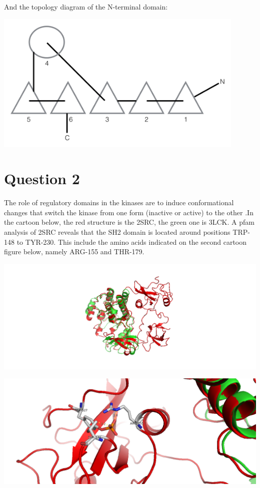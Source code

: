 \documentclass[11pt, a4paper,titlepage]{article}
\begin{document}
\clearpage
And the topology diagram of the N-terminal domain:

\includegraphics[width=12cm]{./Figures/1b.png}

\section*{Question 2}
 The role of regulatory
domains in the kinases are to induce conformational changes that
switch the kinase from one form (inactive or active) to the other
\cite{ConformationalPlasticityKinases}.In the cartoon below, the red
structure is the 2SRC, the green one is 3LCK. A pfam analysis of 2SRC
reveals that the SH2 domain is located around positions TRP-148 to
TYR-230. This include the amino acids indicated on the second cartoon
figure below, namely ARG-155 and THR-179.

\includegraphics[width=15cm]{./Figures/2a.png}

\includegraphics[width=15cm]{./Figures/2b.png}
\end{document}
